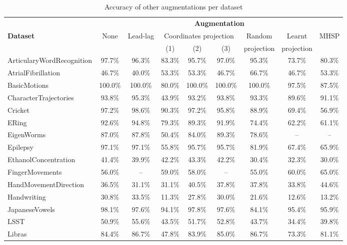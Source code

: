 \documentclass{article}
\theoremstyle{definition}
\theoremstyle{remark}
\begin{document}
	\begin{table}[h]
	\small
	\centering
	\caption{Accuracy of other augmentations per dataset}
	\label{tab:complete_results_all_augs}
	\begin{tabular}{lcccccccc}
	\toprule
	& \multicolumn{8}{c}{\textbf{Augmentation}}\\
	 \cmidrule{2-9}
	 \multirow{2}{*}{\textbf{Dataset}}&\multirow{2}{*}{None}& \multirow{2}{*}{Lead-lag}& \multicolumn{3}{c}{Coordinates projection} & Random& Learnt &  \multirow{2}{*}{MHSP}    \\
	 & & & (1) & (2) &(3) & projection &  projection \\
	\midrule
	ArticularyWordRecognition & 97.7\% & 96.3\% & 83.3\% & 95.7\% & 97.0\% & 95.3\% & 73.7\% & 80.3\% \\
	AtrialFibrillation & 46.7\% & 40.0\% & 53.3\% & 53.3\% & 46.7\% & 66.7\% & 46.7\% & 53.3\% \\
	BasicMotions & 100.0\% & 100.0\% & 80.0\% & 100.0\% & 100.0\% & 100.0\% & 97.5\% & 87.5\% \\
	CharacterTrajectories & 93.8\% & 95.3\% & 43.9\% & 93.2\% & 93.8\% & 93.3\% & 89.6\% & 91.1\% \\
	Cricket & 97.2\% & 98.6\% & 90.3\% & 97.2\% & 95.8\% & 88.9\% & 69.4\% & 56.9\% \\
	ERing & 92.6\% & 94.8\% & 79.3\% & 89.3\% & 91.9\% & 74.4\% & 62.2\% & 61.1\% \\
	EigenWorms & 87.0\% & 87.8\% & 50.4\% & 84.0\% & 89.3\% & 78.6\% & -- & -- \\
	Epilepsy & 97.1\% & 97.1\% & 55.8\% & 95.7\% & 95.7\% & 81.9\% & 67.4\% & 65.9\% \\
	EthanolConcentration & 41.4\% & 39.9\% & 42.2\% & 43.3\% & 42.2\% & 30.4\% & 32.3\% & 30.0\% \\
	FingerMovements & 56.0\% & -- & 59.0\% & 58.0\% & -- & 55.0\% & 60.0\% & 65.0\% \\
	HandMovementDirection & 36.5\% & 31.1\% & 31.1\% & 40.5\% & 37.8\% & 37.8\% & 33.8\% & 44.6\% \\
	Handwriting & 30.8\% & 33.5\% & 11.3\% & 27.8\% & 30.0\% & 21.6\% & 12.6\% & 13.2\% \\
	JapaneseVowels & 98.1\% & 97.6\% & 94.1\% & 97.8\% & 97.6\% & 84.1\% & 95.4\% & 95.9\% \\
	LSST & 50.9\% & 55.6\% & 43.5\% & 51.7\% & 52.8\% & 43.7\% & 34.4\% & 39.8\% \\
	Libras & 84.4\% & 86.7\% & 47.8\% & 83.9\% & 85.0\% & 86.7\% & 73.3\% & 81.1\% \\

\end{tabular}
\end{table}
\end{document}
